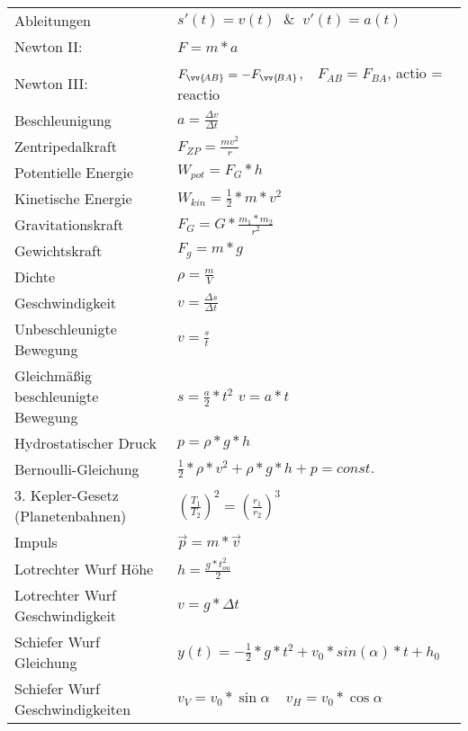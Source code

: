 \documentclass[12pt,a4paper]{paper}
\begin{document}
\begin{tabularx}{\textwidth}{X|X}
	Ableitungen & $s'(t) = v(t) \;\;\&\;\; v'(t) = a(t)$\\
	Newton II: & $F=m*a$\\
	Newton III: & ${F}_{\vv{\!AB}}=-{F}_{\vv{\!BA}}$,$\quad F_{AB} = F_{BA}$, actio = reactio \\
	Beschleunigung & $a=\frac{\Delta v}{\Delta t}$\\
	Zentripedalkraft & $F_{ZP}=\frac{mv^2}{r}$\\
	Potentielle Energie & $W_{pot} = F_G * h$\\
	Kinetische Energie & $W_{kin} = \frac{1}{2}*m*v^2$ \\
	Gravitationskraft & $F_G =G* \frac{m_1 * m_2 }{r^2}$\\
	Gewichtskraft & $F_g = m * g$\\
	Dichte & $\rho = \frac{m}{V}$\\
	Geschwindigkeit & $v = \frac{\Delta s}{\Delta t}$\\
	Unbeschleunigte Bewegung & $ v = \frac{s}{t}$\\
	Gleichmäßig beschleunigte Bewegung & $s = \frac{a}{2}*t^2$ \hspace{.5cm} $v = a * t $\\
	Hydrostatischer Druck & $p = \rho * g * h$ \\
	Bernoulli-Gleichung & $\frac{1}{2}*\rho*v^2 + \rho * g * h + p = const.$\\
	3. Kepler-Gesetz (Planetenbahnen) & $ (\frac{T_1}{T_2})^2 = (\frac{r_1}{r_2})^3$\\
	Impuls & $\vec{p} = m * \vec{v}$\\
	Lotrechter Wurf Höhe & $h = \frac{g* t_{ou}^2}{2}$\\
	Lotrechter Wurf Geschwindigkeit & $v = g * \Delta t$\\
	Schiefer Wurf Gleichung & $y(t) = -\frac{1}{2}*g*t^2 + v_0*sin(\alpha)*t + h_0$\\
	Schiefer Wurf Geschwindigkeiten & $v_{V} = v_0 * \sin{\alpha} \:\:\:\:\: v_{H} = v_0 * \cos\alpha$\\
\end{tabularx}
\end{document}
